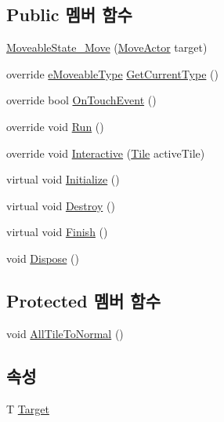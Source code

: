\subsection*{Public 멤버 함수}
\begin{DoxyCompactItemize}
\item 
\hyperlink{class_move_actor_1_1_moveable_state___move_ae8cb7222d1d9f012e220959aafaf8177}{Moveable\+State\+\_\+\+Move} (\hyperlink{class_move_actor}{Move\+Actor} target)
\item 
override \hyperlink{_move_actor_8cs_a90215797ba850e199f3ef63d7c56f132}{e\+Moveable\+Type} \hyperlink{class_move_actor_1_1_moveable_state___move_a88d6f55eb47620bef4f76b34f2c95eaf}{Get\+Current\+Type} ()
\item 
override bool \hyperlink{class_move_actor_1_1_moveable_state___move_a40025af95b4d7cd878474aeadc81cbcc}{On\+Touch\+Event} ()
\item 
override void \hyperlink{class_move_actor_1_1_moveable_state___move_a81659255954f8ff95fcac87a0cfd3c73}{Run} ()
\item 
override void \hyperlink{class_move_actor_1_1_moveable_state___move_ab0fa6e69cbb4c179d2c7ee1381cda850}{Interactive} (\hyperlink{class_tile}{Tile} active\+Tile)
\item 
virtual void \hyperlink{class_m_c_n_1_1_state_a8eabaffe047e6dccd5c5d8aed7bf218a}{Initialize} ()
\item 
virtual void \hyperlink{class_m_c_n_1_1_state_a32af22a6a0a979d3b3a80225426aa839}{Destroy} ()
\item 
virtual void \hyperlink{class_m_c_n_1_1_state_a6de4f94b23916fcd05f589759da9ac3f}{Finish} ()
\item 
void \hyperlink{class_m_c_n_1_1_state_a6c53b2eda47e718ff469fd76a95cf02a}{Dispose} ()
\end{DoxyCompactItemize}
\subsection*{Protected 멤버 함수}
\begin{DoxyCompactItemize}
\item 
void \hyperlink{class_move_actor_1_1_moveable_state_a2da1a565b497b15a220f5ff494ec7a1e}{All\+Tile\+To\+Normal} ()
\end{DoxyCompactItemize}
\subsection*{속성}
\begin{DoxyCompactItemize}
\item 
T \hyperlink{class_m_c_n_1_1_state_a93ba2fd920292031bd6e65b1dc505cb3}{Target}
\end{DoxyCompactItemize}


